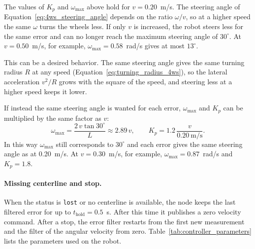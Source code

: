 The values of $K_p$ and $\omega_{\max}$ above hold for $v = 0.20$~m/s. The steering angle of Equation~\eqref{eq:4ws_steering_angle} depends on the ratio $\omega / v$, so at a higher speed the same $\omega$ turns the wheels less. If only $v$ is increased, the robot steers less for the same error and can no longer reach the maximum steering angle of $30^\circ$. At $v = 0.50$~m/s, for example, $\omega_{\max} = 0.58$~rad/s gives at most $13^\circ$.

This can be a desired behavior. The same steering angle gives the same turning radius $R$ at any speed (Equation~\eqref{eq:turning_radius_4ws}), so the lateral acceleration $v^2/R$ grows with the square of the speed, and steering less at a higher speed keeps it lower.

If instead the same steering angle is wanted for each error, $\omega_{\max}$ and $K_p$ can be multiplied by the same factor as $v$:
\begin{equation}
    \omega_{\max} = \frac{2\, v \tan 30^\circ}{L} \approx 2.89\, v, \qquad K_p = 1.2\, \frac{v}{0.20~\text{m/s}}.
    \label{eq:speed_scaling}
\end{equation}
In this way $\omega_{\max}$ still corresponds to $30^\circ$ and each error gives the same steering angle as at 0.20~m/s. At $v = 0.30$~m/s, for example, $\omega_{\max} = 0.87$~rad/s and $K_p = 1.8$.

\paragraph{Missing centerline and stop.}
When the status is \texttt{lost} or no centerline is available, the node keeps the last filtered error for up to $t_{\mathrm{hold}} = 0.5$~s. After this time it publishes a zero velocity command. After a stop, the error filter restarts from the first new measurement and the filter of the angular velocity from zero. Table~\ref{tab:controller_parameters} lists the parameters used on the robot.

